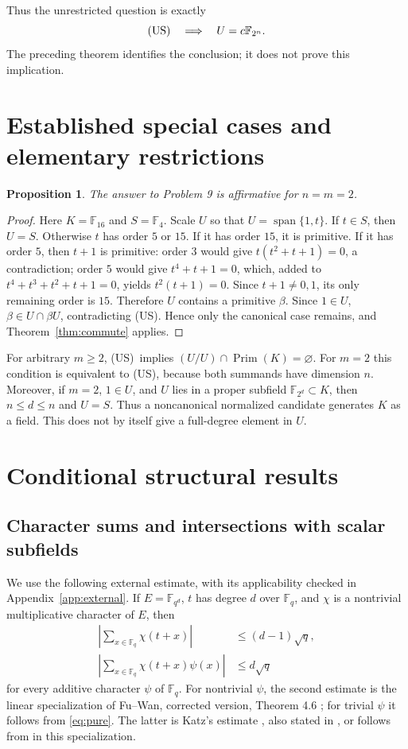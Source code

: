 \documentclass[11pt,a4paper]{article}
\newtheorem{proposition}[theorem]{Proposition}
\theoremstyle{definition}\newtheorem{definition}[theorem]{Definition}
\theoremstyle{remark}\newtheorem{remark}[theorem]{Remark}
\newcommand{\F}{\mathbb F}
\newcommand{\Prim}{\operatorname{Prim}}
\newcommand{\Span}{\operatorname{span}}
\newcommand{\US}{\textup{(US)}}
\numberwithin{equation}{section}
\begin{document}
Thus the unrestricted question is exactly
\begin{equation}\label{eq:classification}
\US\quad\Longrightarrow\quad U=c\F_{2^n}.
\end{equation}
The preceding theorem identifies the conclusion; it does not prove this implication.

\section{Established special cases and elementary restrictions}\label{sec:special}
\begin{proposition}\label{prop:22}
The answer to Problem 9 is affirmative for $n=m=2$.
\end{proposition}
\begin{proof}
Here $K=\F_{16}$ and $S=\F_4$. Scale $U$ so that $U=\Span\{1,t\}$. If $t\in S$, then $U=S$. Otherwise $t$ has order $5$ or $15$. If it has order $15$, it is primitive. If it has order $5$, then $t+1$ is primitive: order $3$ would give $t(t^2+t+1)=0$, a contradiction; order $5$ would give $t^4+t+1=0$, which, added to $t^4+t^3+t^2+t+1=0$, yields $t^2(t+1)=0$. Since $t+1\ne0,1$, its only remaining order is $15$. Therefore $U$ contains a primitive $\beta$. Since $1\in U$, $\beta\in U\cap\beta U$, contradicting \US. Hence only the canonical case remains, and Theorem~\ref{thm:commute} applies.
\end{proof}

For arbitrary $m\ge2$, \US\ implies $(U/U)\cap\Prim(K)=\varnothing$. For $m=2$ this condition is equivalent to \US, because both summands have dimension $n$. Moreover, if $m=2$, $1\in U$, and $U$ lies in a proper subfield $\F_{2^d}\subset K$, then $n\le d\le n$ and $U=S$. Thus a noncanonical normalized candidate generates $K$ as a field. This does not by itself give a full-degree element in $U$.

\section{Conditional structural results}\label{sec:conditional}
\subsection{Character sums and intersections with scalar subfields}
We use the following external estimate, with its applicability checked in Appendix~\ref{app:external}. If $E=\F_{q^d}$, $t$ has degree $d$ over $\F_q$, and $\chi$ is a nontrivial multiplicative character of $E$, then
\begin{align}
\left|\sum_{x\in\F_q}\chi(t+x)\right|&\le(d-1)\sqrt q,\label{eq:pure}\\
\left|\sum_{x\in\F_q}\chi(t+x)\psi(x)\right|&\le d\sqrt q\label{eq:mixed}
\end{align}
for every additive character $\psi$ of $\F_q$. For nontrivial $\psi$, the second estimate is the linear specialization of Fu--Wan, corrected version, Theorem 4.6 \cite{fuwan}; for trivial $\psi$ it follows from \eqref{eq:pure}. The latter is Katz's estimate \cite{katz}, also stated in \cite[Theorem 2.6]{reis}, or follows from \cite[Theorem 4.5]{fuwan} in this specialization.
\end{document}
